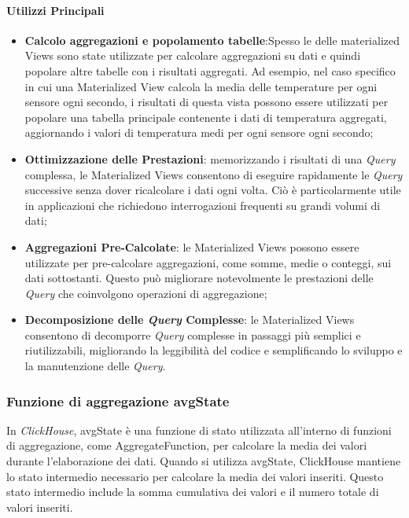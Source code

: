 \paragraph*{Utilizzi Principali}
\begin{itemize}
    \item \textbf{Calcolo aggregazioni e popolamento tabelle}:Spesso le delle materialized Views sono state utilizzate per calcolare aggregazioni su dati e quindi popolare altre tabelle con i risultati aggregati. Ad esempio, nel caso specifico in cui una Materialized View calcola la media delle temperature per ogni sensore ogni secondo, i risultati di questa vista possono essere utilizzati per popolare una tabella principale contenente i dati di temperatura aggregati, aggiornando i valori di temperatura medi per ogni sensore ogni secondo;
    \item \textbf{Ottimizzazione delle Prestazioni}: memorizzando i risultati di una \textit{Query} complessa, le Materialized Views consentono di eseguire rapidamente le \textit{Query} successive senza dover ricalcolare i dati ogni volta. Ciò è particolarmente utile in applicazioni che richiedono interrogazioni frequenti su grandi volumi di dati;
    \item \textbf{Aggregazioni Pre-Calcolate}: le Materialized Views possono essere utilizzate per pre-calcolare aggregazioni, come somme, medie o conteggi, sui dati sottostanti. Questo può migliorare notevolmente le prestazioni delle \textit{Query} che coinvolgono operazioni di aggregazione;
    \item \textbf{Decomposizione delle \textit{Query} Complesse}: le Materialized Views consentono di decomporre \textit{Query} complesse in passaggi più semplici e riutilizzabili, migliorando la leggibilità del codice e semplificando lo sviluppo e la manutenzione delle \textit{Query}.
\end{itemize}


\subsubsection{Funzione di aggregazione avgState}
In \textit{ClickHouse}, avgState è una funzione di stato utilizzata all'interno di funzioni di aggregazione, come AggregateFunction, per calcolare la media dei valori durante l'elaborazione dei dati. Quando si utilizza avgState, ClickHouse mantiene lo stato intermedio necessario per calcolare la media dei valori inseriti. Questo stato intermedio include la somma cumulativa dei valori e il numero totale di valori inseriti.

